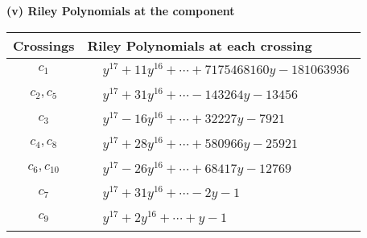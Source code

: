 \documentclass[1p]{elsarticle_modified}
\theoremstyle{definition}
\begin{document}
\newpage\renewcommand{\arraystretch}{1}
\flushleft \textbf{(v) Riley Polynomials at the component}\newline \\
\begin{tabular}{m{50pt}|m{274pt}}
Crossings & \hspace{64pt}Riley Polynomials at each crossing \\
\hline $$\begin{aligned}c_{1}\end{aligned}$$&$\begin{aligned}
&y^{17}+11 y^{16}+\cdots+7175468160 y-181063936
\end{aligned}$\\
\hline $$\begin{aligned}c_{2},c_{5}\end{aligned}$$&$\begin{aligned}
&y^{17}+31 y^{16}+\cdots-143264 y-13456
\end{aligned}$\\
\hline $$\begin{aligned}c_{3}\end{aligned}$$&$\begin{aligned}
&y^{17}-16 y^{16}+\cdots+32227 y-7921
\end{aligned}$\\
\hline $$\begin{aligned}c_{4},c_{8}\end{aligned}$$&$\begin{aligned}
&y^{17}+28 y^{16}+\cdots+580966 y-25921
\end{aligned}$\\
\hline $$\begin{aligned}c_{6},c_{10}\end{aligned}$$&$\begin{aligned}
&y^{17}-26 y^{16}+\cdots+68417 y-12769
\end{aligned}$\\
\hline $$\begin{aligned}c_{7}\end{aligned}$$&$\begin{aligned}
&y^{17}+31 y^{16}+\cdots-2 y-1
\end{aligned}$\\
\hline $$\begin{aligned}c_{9}\end{aligned}$$&$\begin{aligned}
&y^{17}+2 y^{16}+\cdots+y-1
\end{aligned}$\\

\end{tabular}
\end{document}
